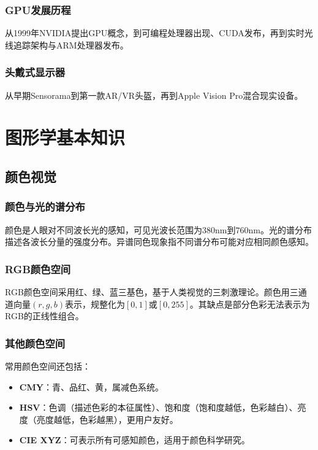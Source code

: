 \documentclass[12pt]{article}
\begin{document}
\subsubsection{GPU发展历程}
从1999年NVIDIA提出GPU概念，到可编程处理器出现、CUDA发布，再到实时光线追踪架构与ARM处理器发布。

\subsubsection{头戴式显示器}
从早期Sensorama到第一款AR/VR头盔，再到Apple Vision Pro混合现实设备。

\newpage

\section{图形学基本知识}

\subsection{颜色视觉}

\subsubsection{颜色与光的谱分布}
颜色是人眼对不同波长光的感知，可见光波长范围为$380\mathrm{nm}$到$760\mathrm{nm}$。光的谱分布描述各波长分量的强度分布。异谱同色现象指不同谱分布可能对应相同颜色感知。

\subsubsection{RGB颜色空间}
RGB颜色空间采用红、绿、蓝三基色，基于人类视觉的三刺激理论。颜色用三通道向量$(r,g,b)$表示，规整化为$[0,1]$或$[0,255]$。其缺点是部分色彩无法表示为RGB的正线性组合。

\subsubsection{其他颜色空间}
常用颜色空间还包括：
\begin{itemize}
    \item \textbf{CMY}：青、品红、黄，属减色系统。
    \item \textbf{HSV}：色调（描述色彩的本征属性）、饱和度（饱和度越低，色彩越白）、亮度（亮度越低，色彩越黑），更用户友好。
    \item \textbf{CIE XYZ}：可表示所有可感知颜色，适用于颜色科学研究。
\end{itemize}
\end{document}
